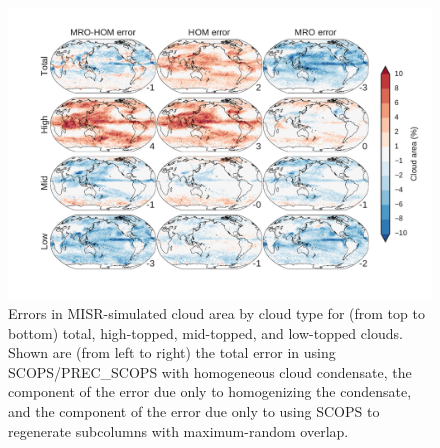 \begin{figure}
\centering
\includegraphics[width=\columnwidth]{graphics/subgrid1_cldmisr_maps_diff.pdf}
\caption{Errors in MISR-simulated cloud area by cloud type for (from top to bottom) total, high-topped, mid-topped, and low-topped clouds. Shown are (from left to right) the total error in using SCOPS/PREC\_SCOPS with homogeneous cloud condensate, the component of the error due only to homogenizing the condensate, and the component of the error due only to using SCOPS to regenerate subcolumns with maximum-random overlap.}
\label{subgrid1_cldmisr_maps_diff}
\end{figure}

